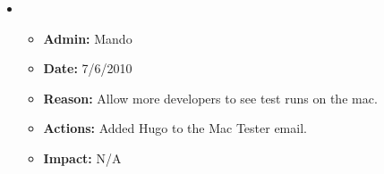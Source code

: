 \documentclass[12pt]{article}
\begin{document}
\begin{itemize}
\item 
\begin{itemize}
\item[] {\bf Admin:} Mando
\item[] {\bf Date:} 7/6/2010
\item[] {\bf Reason:} Allow more developers to see test runs on the mac.
\item[] {\bf Actions:} Added Hugo to the Mac Tester email.
\item[] {\bf Impact:} N/A
\end{itemize}
\end{itemize}
\end{document}
